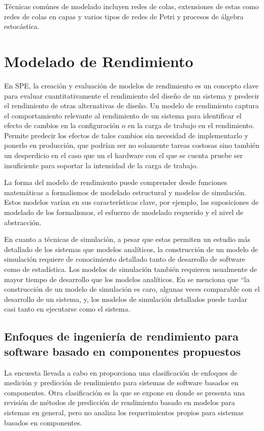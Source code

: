 \documentclass[11pt, twoside]{report}
\begin{document}
Técnicas comúnes de modelado incluyen redes de colas, extensiones de estas como redes de colas en capas y varios tipos de redes de Petri y procesos de álgebra estocástica.


\section{Modelado de Rendimiento}
En SPE, la creación y evaluación de modelos de rendimiento es un concepto clave para evaluar cuantitativamente el rendimiento del diseño de un sistema y predecir el rendimiento de otras alternativas de diseño. Un modelo de rendimiento captura el comportamiento relevante al rendimiento de un sistema para identificar el efecto de cambios en la configuración o en la carga de trabajo en el rendimiento. Permite predecir los efectos de tales cambios sin necesidad de implementarlo y ponerlo en producción, que podrían ser no solamente tareas costosas sino también un desperdicio en el caso que un el hardware con el que se cuenta pruebe ser insuficiente para soportar la intensidad de la carga de trabajo.\cite{noorshams}

La forma del modelo de rendimiento puede comprender desde funciones matemáticas a formalismos de modelado estructural y modelos de simulación. Estos modelos varían en sus características clave, por ejemplo, las suposiciones de modelado de los formalismos, el esfuerzo de modelado requerido y el nivel de abstracción.

En cuanto a técnicas de simulación, a pesar que estas permiten un estudio más detallado de los sistemas que modelos analíticos, la construcción de un modelo de simulación requiere de conocimiento detallado tanto de desarrollo de software como de estadística\cite{thijmen-thesis}. Los modelos de simulación también requieren usualmente de mayor tiempo de desarrollo que los modelos analíticos. En \cite{woodside-et-al} se menciona que ``la construcción de un modelo de simulación es caro, algunas veces comparable con el desarrollo de un sistema, y, los modelos de simulación detallados puede tardar casi tanto en ejecutarse como el sistema.

\subsection{Enfoques de ingeniería de rendimiento para software basado en componentes propuestos}
La encuesta llevada a cabo en \cite{performance-model-survey} proporciona una clasificación de enfoques de medición y predicción de rendimiento para sistemas de software basados en componentes. Otra clasificación es la que se expone en \cite{balsamo-et-al} donde se presenta una revisión de métodos de predicción de rendimiento basado en modelos para sistemas en general, pero no analiza los requerimientos propios para sistemas basados en componentes. 
\end{document}
